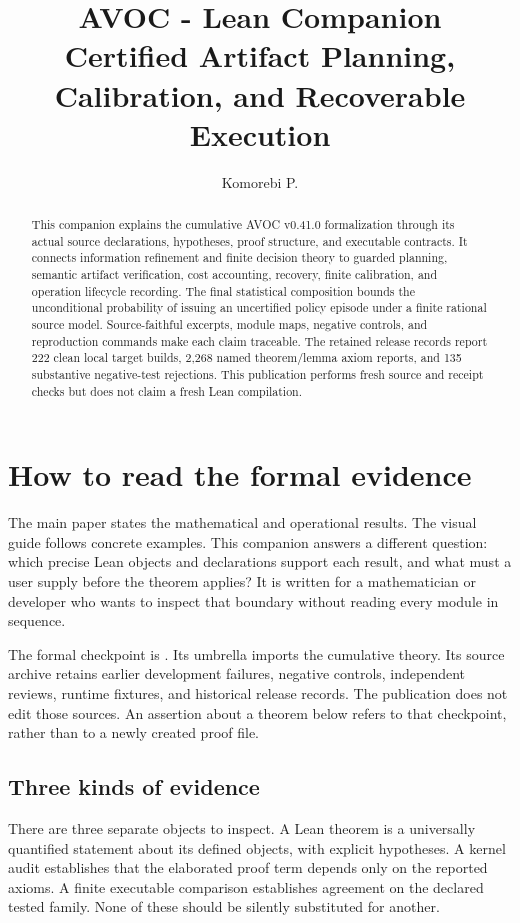\documentclass[11pt]{article}
\title{AVOC - Lean Companion\\[0.5em]\large Certified Artifact Planning, Calibration, and Recoverable Execution}
\author{Komorebi P.}
\date{\avocdate}
\begin{document}
\KomorebiCover
{}

\renewcommand{\paperkind}{Lean companion}

\begin{abstract}
This companion explains the cumulative AVOC v0.41.0 formalization through its
actual source declarations, hypotheses, proof structure, and executable
contracts. It connects information refinement and finite decision theory to
guarded planning, semantic artifact verification, cost accounting, recovery,
finite calibration, and operation lifecycle recording. The final statistical
composition bounds the unconditional probability of issuing an uncertified
policy episode under a finite rational source model. Source-faithful excerpts,
module maps, negative controls, and reproduction commands make each claim
traceable. The retained release records report 222 clean local target builds,
2,268 named theorem/lemma axiom reports, and 135 substantive negative-test
rejections. This publication performs fresh source and receipt checks but does
not claim a fresh Lean compilation.
\end{abstract}
\tableofcontents

\section{How to read the formal evidence}
\label{sec:evidence}
The main paper states the mathematical and operational results. The visual
guide follows concrete examples. This companion answers a different question:
which precise Lean objects and declarations support each result, and what must
a user supply before the theorem applies? It is written for a mathematician or
developer who wants to inspect that boundary without reading every module in
sequence.

The formal checkpoint is . Its umbrella
 imports the cumulative theory. Its source archive retains
earlier development failures, negative controls, independent reviews, runtime
fixtures, and historical release records. The publication does not edit those
sources. An assertion about a theorem below refers to that checkpoint, rather
than to a newly created proof file.

\subsection{Three kinds of evidence}
There are three separate objects to inspect. A Lean theorem is a universally
quantified statement about its defined objects, with explicit hypotheses. A
kernel audit establishes that the elaborated proof term depends only on the
reported axioms. A finite executable comparison establishes agreement on the
declared tested family. None of these should be silently substituted for
another.
\end{document}
